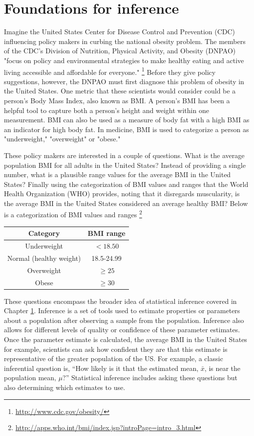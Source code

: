 \chapter{Foundations for inference} 
\label{foundationsForInference}

Imagine the United States Center for Disease Control and Prevention (CDC) influencing policy makers in curbing the national obesity problem. The members of the CDC's Division of Nutrition, Physical Activity, and Obesity (DNPAO) "focus on policy and environmental strategies to make healthy eating and active living accessible and affordable for everyone." \footnote{\url{http://www.cdc.gov/obesity/}} Before they give policy suggestions, however, the DNPAO must first diagnose this problem of obesity in the United States. One metric that these scientists would consider could be a person's Body Mass Index, also known as BMI. A person's BMI has been a helpful tool to capture both a person's height and weight within one measurement. BMI can also be used as a measure of body fat with a high BMI as an indicator for high body fat. In medicine, BMI is used to categorize a person as "underweight," "overweight" or "obese." 

These policy makers are interested in a couple of questions. What is the average population BMI for all adults in the United States? Instead of providing a single number, what is a plausible range values for the average BMI in the United States? Finally using the categorization of BMI values and ranges that the World Health Organization (WHO) provides, noting that it disregards muscularity, is the average BMI in the United States considered an average healthy BMI? Below is a categorization of BMI values and ranges
\footnote{\url{http://apps.who.int/bmi/index.jsp?introPage=intro_3.html}}

\begin{center}
\begin{tabular}{|c|c|}
\hline 
Category & BMI range\tabularnewline
\hline 
\hline 
Underweight & $<18.50$\tabularnewline
\hline 
Normal (healthy weight) & 18.5-24.99\tabularnewline
\hline 
Overweight & $\geq 25$\tabularnewline
\hline 
Obese & $\geq30$\tabularnewline
\hline 
\end{tabular}
\end{center}

These questions encompass the broader idea of statistical inference covered in Chapter \ref{foundationsForInference}. Inference is a set of tools used to estimate properties or parameters about a population after observing a sample from the population. Inference also allows for different levels of quality or confidence of these parameter estimates. Once the parameter estimate is calculated, the average BMI in the United States for example, scientists can ask how confident they are that this estimate is representative of the greater population of the US. For example, a classic inferential question is, ``How likely is it that the estimated mean, $\bar{x}$, is near the population mean, $\mu$?'' Statistical inference includes asking these questions but also determining which estimates to use.

